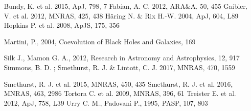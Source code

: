 \documentclass[11pt]{article}
\begin{document}
\begin{thebibliography}{}
{\fontsize{7.5pt}{2pt}\selectfont
\begin{minipage}[t]{0.3\textwidth}
 Bundy, K. et al. 2015, ApJ, 798, 7
 Fabian, A. C. 2012, ARA\&A, 50, 455
 Gaibler, V. et al. 2012, MNRAS, 425, 438
 H\"aring N. \& Rix H.-W. 2004, ApJ, 604, L89
 Hopkins P. et al. 2008, ApJS, 175, 356 
\end{minipage}
\hspace{0.5cm}
\begin{minipage}[t]{0.3\textwidth}
 Martini, P., 2004, Coevolution of Black Holes and Galaxies, 169

 Silk J., Mamon G. A., 2012, Research in Astronomy and Astrophysics, 12, 917
 Simmons, B. D. ; Smethurst, R. J. \& Lintott, C. J. 2017, MNRAS, 470, 1559 
\end{minipage}
\hspace{0.5cm}
\begin{minipage}[t]{0.3\textwidth}
 Smethurst, R. J. et al. 2015, MNRAS, 450, 435
 Smethurst, R. J. et al. 2016, MNRAS, 463, 2986
 Tortora C. et al. 2009, MNRAS, 396, 61
 Treister E. et al. 2012, ApJ, 758, L39
 Urry C. M., Padovani P., 1995, PASP, 107, 803

\end{minipage}
\par}
\end{thebibliography}
\end{document}
